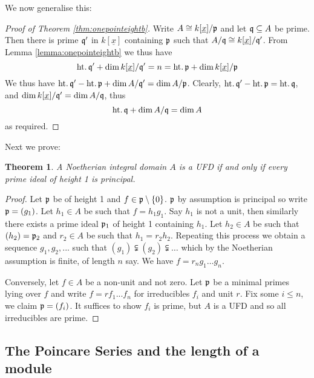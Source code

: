 \documentclass[12pt]{article}
\theoremstyle{plain}
\newtheorem{thm}{Theorem}[subsection] %
\theoremstyle{definition}
\begin{document}
	We now generalise this:
	\begin{proof}[Proof of Theorem \ref{thm:onepointeightb}]
		Write $A \cong k[\underline{x}]/\frak{p}$ and let $\frak{q} \subseteq A$ be prime. Then there is prime $\frak{q}'$ in $k[\underline{x}]$ containing $\frak{p}$ such that $A/\frak{q} \cong k[\underline{x}]/\frak{q}'$. From Lemma \ref{lemma:onepointeightb} we thus have
		\[\operatorname{ht.}\frak{q}' + \operatorname{dim}k[\underline{x}]/\frak{q}' = n = \operatorname{ht.}\frak{p} + \operatorname{dim}k[\underline{x}]/\frak{p}\]
		We thus have $\operatorname{ht.}\frak{q}' - \operatorname{ht.}\frak{p} + \operatorname{dim}A/\frak{q}' = \operatorname{dim}A/\frak{p}$. Clearly, $\operatorname{ht.}\frak{q}' - \operatorname{ht.}\frak{p} = \operatorname{ht.}\frak{q}$, and $\operatorname{dim}k[\underline{x}]/\frak{q}' = \operatorname{dim}A/\frak{q}$, thus
		\[\operatorname{ht.}\frak{q} + \operatorname{dim}A/\frak{q} = \operatorname{dim}A\]
		as required.
	\end{proof}
	Next we prove:
	\begin{thm}
		\label{thm:onepointonetwoa}
		A Noetherian integral domain $A$ is a UFD if and only if every prime ideal of height 1 is principal.
	\end{thm}
	\begin{proof}
		Let $\frak{p}$ be of height 1 and $f \in \frak{p}\setminus\lbrace 0\rbrace$. $\frak{p}$ by assumption is principal so write $\frak{p} = (g_1)$. Let $h_1 \in A$ be such that $f = h_1g_1$. Say $h_1$ is not a unit, then similarly there exists a prime ideal $\frak{p}_1$ of height 1 containing $h_1$. Let $h_2 \in A$ be such that $(h_2) = \frak{p}_2$ and $r_2 \in A$ be such that $h_1 = r_2h_2$. Repeating this process we obtain a sequence $g_1,g_2,...$ such that $(g_1) \subsetneqq (g_2) \subsetneqq \hdots$ which by the Noetherian assumption is finite, of length $n$ say. We have $f = r_n g_1\hdots g_n$.
		
		Conversely, let $f \in A$ be a non-unit and not zero. Let $\frak{p}$ be a minimal primes lying over $f$ and write $f =rf_1...f_n$ for irreducibles $f_i$ and unit $r$. Fix some $i \leq n$, we claim $\frak{p} = (f_i)$. It suffices to show $f_i$ is prime, but $A$ is a UFD and so all irreducibles are prime.
	\end{proof}
	
	\subsection{The Poincare Series and the length of a module}
\end{document}
